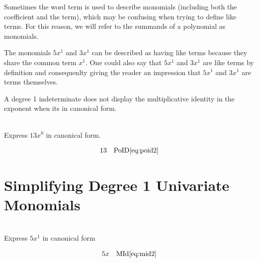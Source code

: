 \documentclass[20150903-160354-rs2.2-MarksMathNotebook.tex]{subfiles}
\begin{document}
Sometimes the word \alert{term} is used to describe monomials (including both the coefficient and the term), which may be confusing when trying to define like terms.  For this reason, we will refer to the summands of a polynomial as monomials.

The monomials $5x^1$ and $3x^1$ can be described as having like terms because they share the common term $x^1$.  One could also say that $5x^1$ and $3x^1$ are like terms by definition and consequenlty giving the reader an impression that $5x^1$ and $3x^1$ are terms themselves.

\begin{remark}
A degree 1 indeterminate does not display the multiplicative identity in the exponent when its in canonical form.
\end{remark}


\begin{example}[id:20141121-093747] \label{20141121-093747} \hfill \\

Express $13x^0$ in canonical form.

\soln

\solnsteps
\begin{align*}
13 && \text{PoID} \eqref{eq:poid2} \\
\end{align*}
\end{example}


\section{Simplifying Degree 1 Univariate Monomials}\label{Simplifying Degree 1 Univariate Monomials}

\begin{example}[id:20141120-202042] \label{20141120-202042} \hfill \\

Express $5x^1$ in canonical form

\soln

\solnsteps
\begin{align*}
5x && \text{MId} \eqref{eq:mid2}
\end{align*}
\end{example}
\end{document}
